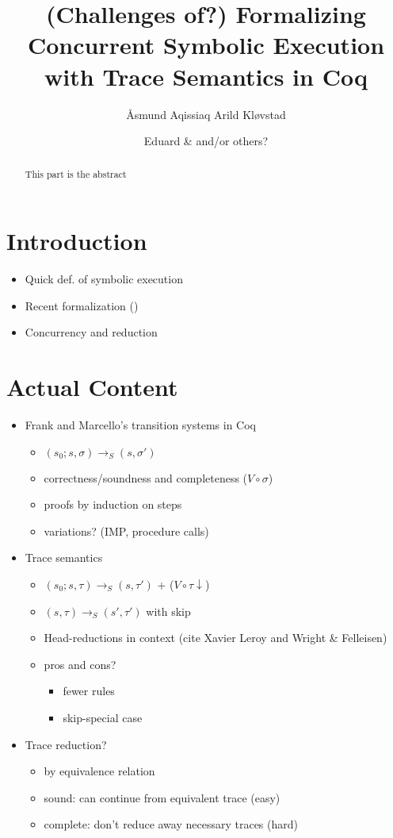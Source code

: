 \documentclass[submission,copyright,creativecommons]{eptcs}
\title{(Challenges of?) Formalizing Concurrent Symbolic Execution with Trace Semantics in Coq}
\author{Åsmund Aqissiaq Arild Kløvstad
\institute{UiO\\ Oslo, Norway}
\institute{Institute of Informatics}
\institute{PSY, maybe?}
\email{aaklovst@ifi.uio.no}
\and
Eduard \& and/or others?
\institute{UiO\\ Oslo, Norway}
\institute{Institute of Informatics}
\institute{PSY, maybe?}
}
\begin{document}
\maketitle

\begin{abstract}
  This part is the abstract
\end{abstract}

\section*{Introduction}
\begin{itemize}
  \item Quick def. of symbolic execution
  \item Recent formalization (\cite{boer2021})
  \item Concurrency and reduction
\end{itemize}

\section*{Actual Content}
\begin{itemize}
  \item Frank and Marcello's transition systems in Coq
        \begin{itemize}
          \item $(s_{0} ; s, \sigma) \rightarrow_{S} (s, \sigma')$
          \item correctness/soundness and completeness ($V \circ \sigma$)
          \item proofs by induction on steps
          \item variations? (IMP, procedure calls)
        \end{itemize}
  \item Trace semantics
        \begin{itemize}
          \item $(s_{0} ; s, \tau) \rightarrow_{S} (s, \tau')$ + ($V \circ \tau\downarrow$)
          \item $(s, \tau) \rightarrow_{S} (s', \tau')$  with skip
          \item Head-reductions in context (cite Xavier Leroy and Wright \& Felleisen)
          \item pros and cons?
                \begin{itemize}
                  \item fewer rules
                  \item skip-special case
                \end{itemize}
        \end{itemize}
  \item Trace reduction?
        \begin{itemize}
          \item by equivalence relation
          \item sound: can continue from equivalent trace (easy)
          \item complete: don't reduce away necessary traces (hard)
        \end{itemize}
\end{itemize}

\nocite{*}


\end{document}
